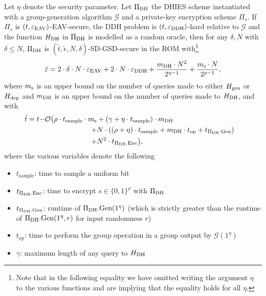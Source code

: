 \begin{theorem} \label{theorem:sdgsd-security}
	Let $\eta$ denote the security parameter.
	Let $\Pi_{\mathrm{DH}}$ the DHIES scheme instantiated with a group-generation algorithm $\mathcal{G}$ and a private-key encryption scheme $\Pi_s$.  If $\Pi_s$ is $(t, \varepsilon_\mathrm{EAV})$-EAV-secure, the DDH problem is $(t, \varepsilon_\mathrm{DDH})$-hard relative to $\mathcal{G}$ and the function $H_\mathrm{DH}$ in $\Pi_{\mathrm{DH}}$ is modelled as a random oracle, then for any $\delta, N$ with $\delta \le N$, $\Pi_{\mathrm{DH}}$ is $(\tilde{t}, \tilde{\epsilon}, N, \delta)$-SD-GSD-secure in the ROM with\footnote{Note that in the following equality we have omitted writing the argument $\eta$ to the various functions and are implying that the equality holds for all $\eta$.}
	\[
		\tilde{\varepsilon} = 2 \cdot \delta \cdot N \cdot \varepsilon_\mathrm{EAV} + 2 \cdot N \cdot \varepsilon_\mathrm{DDH} + \frac{m_\mathrm{DH} \cdot N^2}{2^{\eta - 1}} + \frac{m_\mathrm{s} \cdot N}{2^{\rho - 1}},
	\]
	where $m_\mathrm{s}$ is an upper bound on the number of queries made to either $H_\mathrm{gen}$ or $H_\mathrm{dep}$ and $m_\mathrm{DH}$ is an upper bound on the number of queries made to $H_\mathrm{DH}$, and with
	\[
		\tilde{t} = t \begin{aligned}[t]
			- & \mathcal{O}
			\begin{aligned}[t]
				\big(\rho \cdot t_{\mathrm{sample}} \cdot m_\mathrm{s} & + (\gamma + \eta \cdot t_{\mathrm{sample}}) \cdot m_\mathrm{DH} \\ + & N \cdot ((\rho + \eta) \cdot t_{\mathrm{sample}} + m_\mathrm{DH} \cdot t_{\mathrm{op}} + t_{\Pi_{\mathrm{DH}}.\mathrm{Gen}})  \\ + & N^2 \cdot t_{\Pi_{\mathrm{DH}}.\mathrm{Enc}}\big), \\
			\end{aligned}
		\end{aligned}
	\]
	where the various variables denote the following
	\begin{itemize}
		\item $t_{\mathrm{sample}}$: time to sample a uniform bit
		\item $t_{\Pi_{\mathrm{DH}}.\mathrm{Enc}}$: time to encrypt $s \in \{0, 1\}^\rho$ with $\Pi_{\mathrm{DH}}$
		\item $t_{\Pi_{\mathrm{DH}}.\mathrm{Gen}}$: runtime of $\Pi_{\mathrm{DH}}.\mathrm{Gen}(1^\eta)$ (which is strictly greater than the runtime of $\Pi_{\mathrm{DH}}.\mathrm{Gen}(1^\eta, r)$ for input randomness $r$)
		\item $t_{\mathrm{op}}$: time to perform the group operation in a group output by $\mathcal{G}(1^\eta)$
		\item $\gamma$: maximum length of any query to $H_\mathrm{DH}$
	\end{itemize}
\end{theorem}

